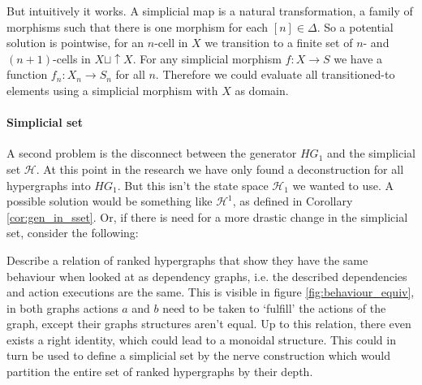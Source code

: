 \documentclass[12pt]{article}
\theoremstyle{definition}
\newcommand{\1}{\mathbbm{1}}
\renewcommand{\H}{\mathcal{H}}
\begin{document}
But intuitively it works. A simplicial map is a natural transformation, a family of morphisms such that there is one morphism for each $[n]\in \Delta$. So a potential solution is pointwise, for an $n$-cell in $X$ we transition to a finite set of $n$- and $(n+1)$-cells in $X\sqcup \uparrow X$. For any simplicial morphism $f: X\to S$ we have a function $f_n: X_n\to S_n$ for all $n$. Therefore we could evaluate all transitioned-to elements using a simplicial morphism with $X$ as domain.

\paragraph{Simplicial set}
A second problem is the disconnect between the generator $HG_1$ and the simplicial set $\H$. At this point in the research we have only found a deconstruction for all hypergraphs into $HG_1$. But this isn't the state space $\H_1$ we wanted to use. A possible solution would be something like $\H^1$, as defined in Corollary \ref{cor:gen_in_sset}. Or, if there is need for a more drastic change in the simplicial set, consider the following:

Describe a relation of ranked hypergraphs that show they have the same behaviour when looked at as dependency graphs, i.e. the described dependencies and action executions are the same. This is visible in figure \ref{fig:behaviour_equiv}, in both graphs actions $a$ and $b$ need to be taken to `fulfill' the actions of the graph, except their graphs structures aren't equal. Up to this relation, there even exists a right identity, which could lead to a monoidal structure. This could in turn be used to define a simplicial set by the nerve construction which would partition the entire set of ranked hypergraphs by their depth. 
\end{document}
